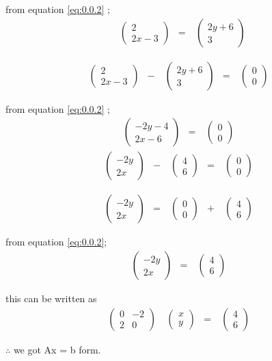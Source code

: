 \documentclass[journal,12pt,twocolumn]{IEEEtran}
\theoremstyle{remark}
\newcommand{\myvec}[1]{\ensuremath{\begin{pmatrix}#1\end{pmatrix}}}
\numberwithin{equation}{subsection}
\begin{document}
       from equation \eqref{eq:0.0.2} ;
     \begin{align}
      &\ \myvec{2\\2x-3 }&=
&\ \myvec{2y+6\\3}
\end{align} 
      
     \begin{align}
&\ \myvec{2\\2x-3 }&-
&\ \myvec{2y+6\\3} &= 
&\ \myvec{0\\0} &
\end{align} 
      
       from equation \eqref{eq:0.0.2} ;
     \begin{align}
&\ \myvec{-2y-4\\2x-6 } &=
&\ \myvec{0\\0} & 
\end{align} 
     \begin{align}
&\ \myvec{-2y\\2x }&-
&\ \myvec{4\\6} &= 
&\ \myvec{0\\0} &
\end{align} 
    
     \begin{align}
&\ \myvec{-2y\\2x }&=
&\ \myvec{0\\0} &+ 
&\ \myvec{4\\6} &
\end{align} 

       from equation \eqref{eq:0.0.2};
     \begin{align}
&\ \myvec{-2y\\2x }&=
&\ \myvec{4\\6} & 
\end{align} 

      this can be written as 
     \begin{align}
&\ \myvec{0 & -2\\2 & 0}&
\ \myvec{x\\y}&=
&\ \myvec{4\\6} & 
\end{align} 

     $\therefore$ we got Ax = b form.  
\end{document}
